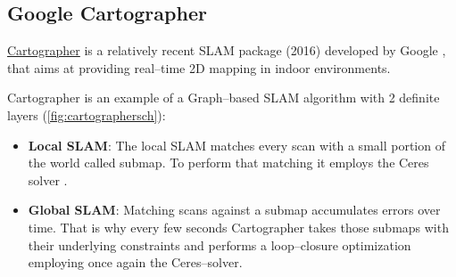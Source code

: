 \begin{table}[htb]
  \centering
  \caption{Hector SLAM main parameters}
  \label{tab:hector}
\end{table} 

\subsection{Google Cartographer} \label{sub:cartographer}

\href{https://google-cartographer.readthedocs.io/en/latest/}{Cartographer} is a relatively recent SLAM package (2016) developed by Google , that aims at providing real--time 2D mapping in indoor environments.

Cartographer is an example of a Graph--based SLAM algorithm with 2 definite layers (\autoref{fig:cartographersch}):
\begin{itemize}
  \item \textbf{Local SLAM}: The local SLAM matches every scan with a small portion of the world called submap. To perform that matching it employs the Ceres solver .

  \item \textbf{Global SLAM}: Matching scans against a submap accumulates errors over time. That is why every few seconds Cartographer takes those submaps with their underlying constraints and performs a loop--closure optimization employing once again the Ceres--solver.
\end{itemize}

